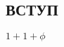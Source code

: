 \documentclass[12pt,a4paper,oneside]{amsart}
\begin{document}
 
 \thispagestyle{empty}
 \tableofcontents 
 \newpage


 \begin{flushleft}
  \section{ВСТУП} 
 \end{flushleft}

 $1+1 + \phi$
\end{document}
